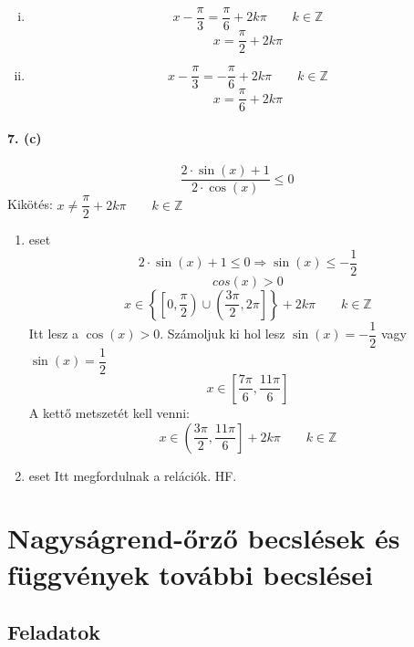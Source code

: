 \documentclass[12pt,a4paper,fleqn]{article}
\newcommand{\myparagraph}[1]{\paragraph{#1}\mbox{}}
\begin{document}

\clearpage

\begin{enumerate}[i.]
  \item
  \[ x - \dfrac{\pi}{3} = \dfrac{\pi}{6} + 2k\pi \qquad k \in \mathbb{Z} \]
  \[ x = \dfrac{\pi}{2} + 2k\pi \]
  \item
  \[ x - \dfrac{\pi}{3} = -\dfrac{\pi}{6} + 2k\pi \qquad k \in \mathbb{Z} \]
  \[ x = \dfrac{\pi}{6} + 2k\pi \]
\end{enumerate}

\myparagraph{7. (c)}
\[ \dfrac{2 \cdot \sin(x) + 1}{2 \cdot \cos(x)} \leq 0 \]
Kikötés: $ x \neq \dfrac{\pi}{2} + 2k\pi \qquad k \in \mathbb{Z} $
\begin{enumerate}
  \item eset
  \[ 2 \cdot \sin(x) + 1 \leq 0 \Rightarrow \sin(x) \leq -\dfrac{1}{2}\]
  \[ cos(x) > 0 \]
  \[ x \in \left\{ \left[0, \dfrac{\pi}{2}\right)
    \cup \left(\dfrac{3\pi}{2}, 2\pi\right] \right\} + 2k\pi \qquad
    k \in \mathbb{Z} \]
  Itt lesz a $\cos(x) > 0$. Számoljuk ki hol lesz $\sin(x) = -\dfrac{1}{2}$ vagy
    $\sin(x) = \dfrac{1}{2}$
  \[ x \in \left[\dfrac{7\pi}{6}, \dfrac{11\pi}{6}\right] \]
  A kettő metszetét kell venni:
  \[ x \in \left(\dfrac{3\pi}{2}, \dfrac{11\pi}{6}\right] + 2k\pi \qquad
    k \in \mathbb{Z} \]
  \item eset
  Itt megfordulnak a relációk. HF.
\end{enumerate}


\clearpage
\section{Nagyságrend-őrző becslések és\\ függvények további becslései}
\setcounter{subsection}{1}
\subsection{Feladatok}
\end{document}
